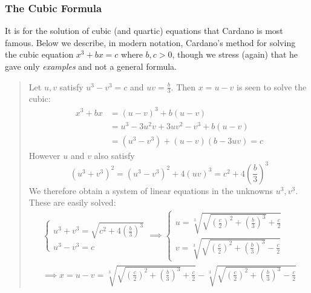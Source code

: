 \subsubsection*{The Cubic Formula}

It is for the solution of cubic (and quartic) equations that Cardano is most famous. Below we describe, in modern notation, Cardano's method for solving the cubic equation $x^3+bx=c$ where $b,c>0$, though we stress (again) that he gave only \emph{examples} and not a general formula.


\begin{quote}
	Let $u,v$ satisfy $u^3-v^3=c$ and $uv=\frac{b}{3}$.
	Then $x=u-v$ is seen to solve the cubic:
	\begin{align*}
		x^3+bx
		&=(u-v)^3+b(u-v)\\
		&=u^3-3u^2v+3uv^2-v^3+b(u-v)\\
		&=(u^3-v^3)+(u-v)(b-3uv) =c
	\end{align*}
	However $u$ and $v$ also satisfy
	\[
		(u^3+v^3)^2=(u^3-v^3)^2+4(uv)^3
			=c^2+4\left(\frac{b}{3}\right)^3
	\]
	We therefore obtain a system of linear equations in the unknowns $u^3,v^3$. These are easily solved:
	\begin{gather*}
		\begin{cases}
			u^3+v^3=\sqrt{c^2+4\left(\frac{b}{3}\right)^3}\\
			u^3-v^3=c
		\end{cases}
		\implies
		\begin{cases}
			u=\sqrt[3]{\sqrt{\left(\frac c2\right)^2+\left(\frac{b}{3}\right)^3}+\frac c2}\\
			v=\sqrt[3]{\sqrt{\left(\frac c2\right)^2+\left(\frac{b}{3}\right)^3}-\frac c2}
		\end{cases}
		\\[8pt]
		\implies x=u-v
		=\sqrt[3]{
			\sqrt{\left(\frac c2\right)^2+\left(\frac{b}{3}\right)^3} +\frac c2
		}
		-\sqrt[3]{
			\sqrt{\left(\frac c2\right)^2+\left(\frac{b}{3}\right)^3} -\frac c2
		}
	\end{gather*}
\end{quote}


